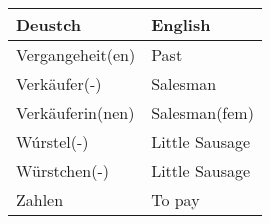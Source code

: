 \documentclass{article}
\renewcommand{\arraystretch}{1}
\begin{document}
\newpage

\begin{minipage}{0.48\textwidth}
    \centering
    \renewcommand{\arraystretch}{1.5}
    \begin{tabular}{|>{\raggedright\arraybackslash}p{3.5cm}|>{\raggedright\arraybackslash}p{3.5cm}|}
        \hline
        \rowcolor{gray!20} \textbf{Deustch} & \textbf{English} \\
        \hline
        Vergangeheit(en) & Past \\\hline
        Verkäufer(-) & Salesman \\\hline
        Verkäuferin(nen) & Salesman(fem) \\\hline
        Wúrstel(-) & Little Sausage \\\hline
        Würstchen(-) & Little Sausage \\\hline
        Zahlen & To pay \\\hline
    \end{tabular}
\end{minipage}%
\end{document}
